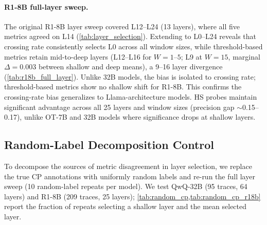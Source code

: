 \paragraph{R1-8B full-layer sweep.}
\label{app:r18b_full_layer}
The original R1-8B layer sweep covered L12--L24 (13 layers), where all five metrics agreed on L14 (\cref{tab:layer_selection}). Extending to L0--L24 reveals that crossing rate consistently selects L0 across all window sizes, while threshold-based metrics retain mid-to-deep layers (L12--L16 for $W{=}1$--$5$; L9 at $W{=}15$, marginal $\Delta{=}0.003$ between shallow and deep means), a 9--16 layer divergence (\cref{tab:r18b_full_layer}). Unlike 32B models, the bias is isolated to crossing rate; threshold-based metrics show no shallow shift for R1-8B. This confirms the crossing-rate bias generalizes to Llama-architecture models. HS probes maintain significant advantage across all 25 layers and window sizes (precision gap ${\sim}$0.15--0.17), unlike OT-7B and 32B models where significance drops at shallow layers.

\begin{table}[htbp]
\centering
\small
\caption{R1-8B full-layer sweep (L0--L24, extending the original L12--L24 range). Best layer selected by crossing rate vs.\ threshold-based metrics across four window sizes. Score = balanced accuracy at the threshold-based layer. Layer gap = crossing-rate layer minus threshold-based layer.}
\label{tab:r18b_full_layer}
\end{table}

\subsection{Random-Label Decomposition Control}
\label{app:random_cp}

To decompose the sources of metric disagreement in layer selection, we replace the true CP annotations with uniformly random labels and re-run the full layer sweep (10 random-label repeats per model). We test QwQ-32B (95 traces, 64 layers) and R1-8B (209 traces, 25 layers); \cref{tab:random_cp,tab:random_cp_r18b} report the fraction of repeats selecting a shallow layer and the mean selected layer.

